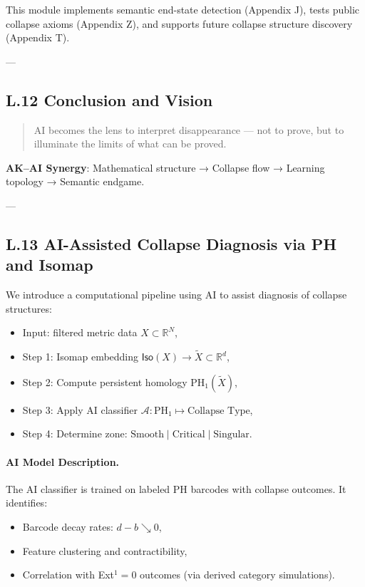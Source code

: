 \documentclass[11pt]{article}
\begin{document}
\begin{axiom}
\begin{axiom}
{{This module implements semantic end-state detection (Appendix J),  
tests public collapse axioms (Appendix Z),  
and supports future collapse structure discovery (Appendix T).

---

\subsection*{L.12 Conclusion and Vision}

\begin{quote}
AI becomes the lens to interpret disappearance —  
not to prove, but to illuminate the limits of what can be proved.
\end{quote}

\textbf{AK–AI Synergy}:  
Mathematical structure → Collapse flow → Learning topology → Semantic endgame.

---

\subsection*{L.13 AI-Assisted Collapse Diagnosis via PH and Isomap}

We introduce a computational pipeline using AI to assist diagnosis of collapse structures:

\begin{itemize}
  \item Input: filtered metric data \( X \subset \mathbb{R}^N \),
  \item Step 1: Isomap embedding \( \mathsf{Iso}(X) \to \tilde{X} \subset \mathbb{R}^d \),
  \item Step 2: Compute persistent homology \( \mathrm{PH}_1(\tilde{X}) \),
  \item Step 3: Apply AI classifier \( \mathcal{A}: \mathrm{PH}_1 \mapsto \text{Collapse Type} \),
  \item Step 4: Determine zone: $\text{Smooth} \mid \text{Critical} \mid \text{Singular}$.
\end{itemize}

\paragraph{AI Model Description.}  
The AI classifier is trained on labeled PH barcodes with collapse outcomes.  
It identifies:
\begin{itemize}
  \item Barcode decay rates: $d-b \searrow 0$,
  \item Feature clustering and contractibility,
  \item Correlation with Ext$^1 = 0$ outcomes (via derived category simulations).
\end{itemize}

}}
\end{axiom}
\end{axiom}
\end{document}
